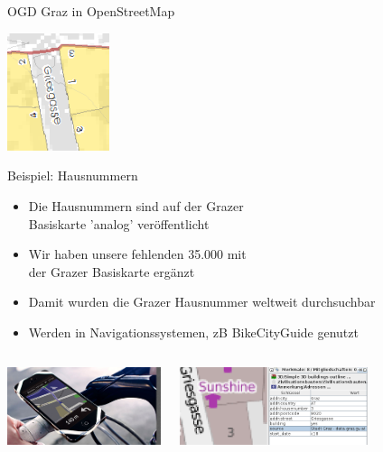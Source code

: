 \documentclass{beamer}
\begin{document}
\begin{frame}{OGD Graz in OpenStreetMap}
    
  \vspace*{-1.9cm}
 \hfill \includegraphics[width=3.0cm]{basiskarte.png}

  \vspace*{-2.0cm}
    Beispiel: Hausnummern

    \begin{itemize}
        \item Die Hausnummern sind auf der Grazer \\ Basiskarte 'analog' veröffentlicht
        \item Wir haben unsere fehlenden 35.000 mit \\ der Grazer Basiskarte ergänzt
  \vspace*{0.2cm}
        \item Damit wurden die Grazer Hausnummer weltweit durchsuchbar
        \item Werden in Navigationssystemen, zB BikeCityGuide genutzt
    \end{itemize}

  \vspace*{-0.7cm}
\begin{columns}[c]
\begin{center}
\includegraphics[width=4.5cm]{bcg.png}
\end{center}
\begin{center}
\includegraphics[width=5.5cm]{osm-gg3.png}
\end{center}
\end{columns}

\end{frame}
\end{document}
